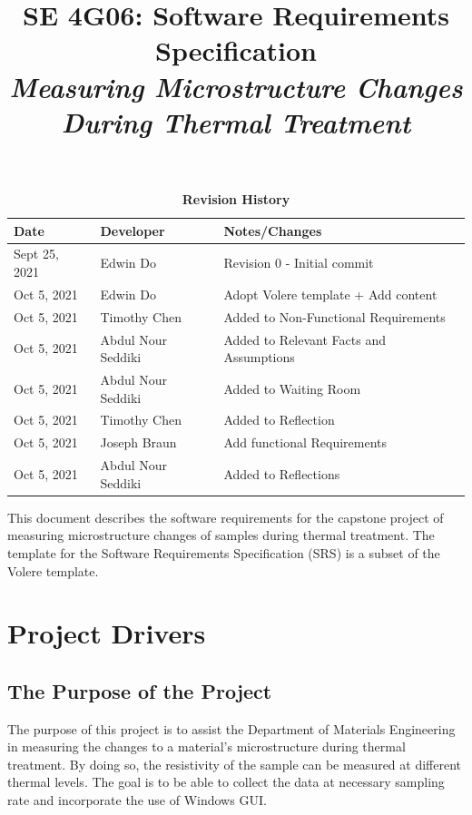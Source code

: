 \documentclass[12pt, titlepage]{article}
\title{SE 4G06: Software Requirements Specification\\\textit{Measuring Microstructure Changes During Thermal Treatment }}
\author{\authname}
\date{}
\begin{document}
\maketitle

\tableofcontents
\listoftables
\listoffigures

\begin{table}[H]
\caption{\bf Revision History}
\begin{tabularx}{\textwidth}{p{2.5cm}p{2.5cm}X}
\toprule {\bf Date} & {\bf Developer} & {\bf Notes/Changes}\\
\midrule
Sept 25, 2021 & Edwin Do & Revision 0 - Initial commit\\
Oct 5, 2021 & Edwin Do & Adopt Volere template + Add content \\
Oct 5, 2021 & Timothy Chen & Added to Non-Functional Requirements\\
Oct 5, 2021 & Abdul Nour Seddiki & Added to Relevant Facts and Assumptions\\
Oct 5, 2021 & Abdul Nour Seddiki & Added to Waiting Room\\
Oct 5, 2021 & Timothy Chen & Added to Reflection\\
Oct 5, 2021 & Joseph Braun & Add functional Requirements \\ 
Oct 5, 2021 & Abdul Nour Seddiki & Added to Reflections\\

\bottomrule
\end{tabularx}
\end{table}

\newpage


\noindent This document describes the software requirements for the capstone project of measuring microstructure changes of samples during thermal treatment. The template for the Software Requirements Specification (SRS) is a subset of the Volere
template.


\section{Project Drivers}

\subsection{The Purpose of the Project}
The purpose of this project is to assist the Department of Materials Engineering in measuring the changes to a material's microstructure during thermal treatment. 
By doing so, the resistivity of the sample can be measured at different thermal levels. The goal is to be able to collect the data at necessary sampling rate and 
incorporate the use of Windows GUI. 
\end{document}
